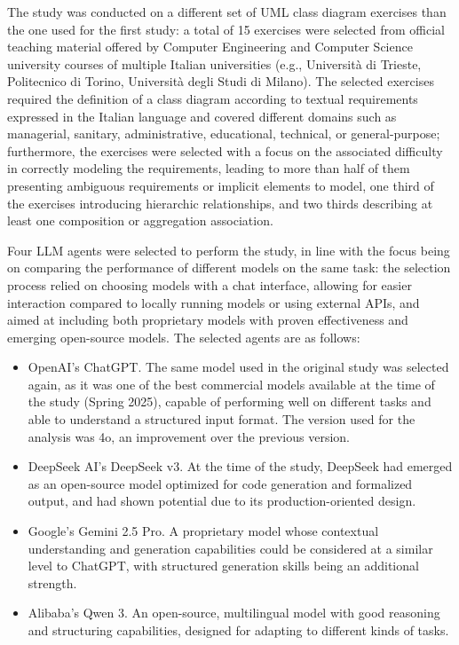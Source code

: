 The study was conducted on a different set of UML class diagram exercises than the one used for the first study: a total of 15 exercises were selected from official teaching material offered by Computer Engineering and Computer Science university courses of multiple Italian universities (e.g., Università di Trieste, Politecnico di Torino, Università degli Studi di Milano). The selected exercises required the definition of a class diagram according to textual requirements expressed in the Italian language and covered different domains such as managerial, sanitary, administrative, educational, technical, or general-purpose; furthermore, the exercises were selected with a focus on the associated difficulty in correctly modeling the requirements, leading to more than half of them presenting ambiguous requirements or implicit elements to model, one third of the exercises introducing hierarchic relationships, and two thirds describing at least one composition or aggregation association.

Four LLM agents were selected to perform the study, in line with the focus being on comparing the performance of different models on the same task: the selection process relied on choosing models with a chat interface, allowing for easier interaction compared to locally running models or using external APIs, and aimed at including both proprietary models with proven effectiveness and emerging open-source models. The selected agents are as follows:

\begin{itemize}
    \item OpenAI's ChatGPT. The same model used in the original study was selected again, as it was one of the best commercial models available at the time of the study (Spring 2025), capable of performing well on different tasks and able to understand a structured input format. The version used for the analysis was 4o, an improvement over the previous version.
    \item DeepSeek AI's DeepSeek v3. At the time of the study, DeepSeek had emerged as an open-source model optimized for code generation and formalized output, and had shown potential due to its production-oriented design. 
    \item Google's Gemini 2.5 Pro. A proprietary model whose contextual understanding and generation capabilities could be considered at a similar level to ChatGPT, with structured generation skills being an additional strength. 
    \item Alibaba's Qwen 3. An open-source, multilingual model with good reasoning and structuring capabilities, designed for adapting to different kinds of tasks.
\end{itemize}

